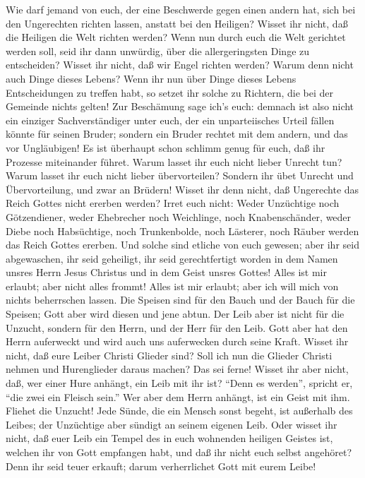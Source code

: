  Wie darf jemand von euch, der eine Beschwerde gegen einen
andern hat, sich bei den Ungerechten richten lassen, anstatt bei den
Heiligen?  Wisset ihr nicht, daß die Heiligen die Welt
richten werden? Wenn nun durch euch die Welt gerichtet werden soll, seid
ihr dann unwürdig, über die allergeringsten Dinge zu entscheiden?
 Wisset ihr nicht, daß wir Engel richten werden? Warum
denn nicht auch Dinge dieses Lebens?  Wenn ihr nun über
Dinge dieses Lebens Entscheidungen zu treffen habt, so setzet ihr solche
zu Richtern, die bei der Gemeinde nichts gelten!  Zur
Beschämung sage ich's euch: demnach ist also nicht ein einziger
Sachverständiger unter euch, der ein unparteiisches Urteil fällen könnte
für seinen Bruder;  sondern ein Bruder rechtet mit dem
andern, und das vor Ungläubigen!  Es ist überhaupt schon
schlimm genug für euch, daß ihr Prozesse miteinander führet. Warum
lasset ihr euch nicht lieber Unrecht tun? Warum lasset ihr euch nicht
lieber übervorteilen?  Sondern ihr übet Unrecht und
Übervorteilung, und zwar an Brüdern!  Wisset ihr denn
nicht, daß Ungerechte das Reich Gottes nicht ererben werden? Irret euch
nicht: Weder Unzüchtige noch Götzendiener, weder Ehebrecher noch
Weichlinge, noch Knabenschänder,  weder Diebe noch
Habsüchtige, noch Trunkenbolde, noch Lästerer, noch Räuber werden das
Reich Gottes ererben.  Und solche sind etliche von euch
gewesen; aber ihr seid abgewaschen, ihr seid geheiligt, ihr seid
gerechtfertigt worden in dem Namen unsres Herrn Jesus Christus und in
dem Geist unsres Gottes!  Alles ist mir erlaubt; aber
nicht alles frommt! Alles ist mir erlaubt; aber ich will mich von nichts
beherrschen lassen.  Die Speisen sind für den Bauch und
der Bauch für die Speisen; Gott aber wird diesen und jene abtun. Der
Leib aber ist nicht für die Unzucht, sondern für den Herrn, und der Herr
für den Leib.  Gott aber hat den Herrn auferweckt und
wird auch uns auferwecken durch seine Kraft.  Wisset ihr
nicht, daß eure Leiber Christi Glieder sind? Soll ich nun die Glieder
Christi nehmen und Hurenglieder daraus machen? Das sei ferne!
 Wisset ihr aber nicht, daß, wer einer Hure anhängt, ein
Leib mit ihr ist? ``Denn es werden'', spricht er, ``die zwei ein Fleisch
sein.''  Wer aber dem Herrn anhängt, ist ein Geist mit
ihm.  Fliehet die Unzucht! Jede Sünde, die ein Mensch
sonst begeht, ist außerhalb des Leibes; der Unzüchtige aber sündigt an
seinem eigenen Leib.  Oder wisset ihr nicht, daß euer
Leib ein Tempel des in euch wohnenden heiligen Geistes ist, welchen ihr
von Gott empfangen habt, und daß ihr nicht euch selbst angehöret?
 Denn ihr seid teuer erkauft; darum verherrlichet Gott
mit eurem Leibe!

